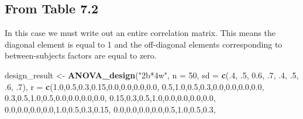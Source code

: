 \documentclass[
]{book}
\newenvironment{Shaded}{\begin{snugshade}}{\end{snugshade}}
\newcommand{\DataTypeTok}[1]{\textcolor[rgb]{0.13,0.29,0.53}{#1}}
\newcommand{\DecValTok}[1]{\textcolor[rgb]{0.00,0.00,0.81}{#1}}
\newcommand{\FloatTok}[1]{\textcolor[rgb]{0.00,0.00,0.81}{#1}}
\newcommand{\KeywordTok}[1]{\textcolor[rgb]{0.13,0.29,0.53}{\textbf{#1}}}
\newcommand{\NormalTok}[1]{#1}
\newcommand{\StringTok}[1]{\textcolor[rgb]{0.31,0.60,0.02}{#1}}
\begin{document}
\hypertarget{from-table-7.2}{%
\subsection{From Table 7.2}\label{from-table-7.2}}

In this case we must write out an entire correlation matrix.
This means the diagonal element is equal to 1 and the off-diagonal elements corresponding to between-subjects factors are equal to zero.

\begin{Shaded}
\begin{Highlighting}[]
\NormalTok{design_result <-}\StringTok{ }\KeywordTok{ANOVA_design}\NormalTok{(}\StringTok{"2b*4w"}\NormalTok{,}
                              \DataTypeTok{n =} \DecValTok{50}\NormalTok{,}
                              \DataTypeTok{sd =} \KeywordTok{c}\NormalTok{(.}\DecValTok{4}\NormalTok{, }\FloatTok{.5}\NormalTok{, }\FloatTok{0.6}\NormalTok{, }\FloatTok{.7}\NormalTok{,}
                                     \FloatTok{.4}\NormalTok{, }\FloatTok{.5}\NormalTok{, }\FloatTok{.6}\NormalTok{, }\FloatTok{.7}\NormalTok{),}
                              \DataTypeTok{r =} \KeywordTok{c}\NormalTok{(}\FloatTok{1.0}\NormalTok{,}\FloatTok{0.5}\NormalTok{,}\FloatTok{0.3}\NormalTok{,}\FloatTok{0.15}\NormalTok{,}\FloatTok{0.0}\NormalTok{,}\FloatTok{0.0}\NormalTok{,}\FloatTok{0.0}\NormalTok{,}\FloatTok{0.0}\NormalTok{,}
                                    \FloatTok{0.5}\NormalTok{,}\FloatTok{1.0}\NormalTok{,}\FloatTok{0.5}\NormalTok{,}\FloatTok{0.3}\NormalTok{,}\FloatTok{0.0}\NormalTok{,}\FloatTok{0.0}\NormalTok{,}\FloatTok{0.0}\NormalTok{,}\FloatTok{0.0}\NormalTok{,}
                                    \FloatTok{0.3}\NormalTok{,}\FloatTok{0.5}\NormalTok{,}\FloatTok{1.0}\NormalTok{,}\FloatTok{0.5}\NormalTok{,}\FloatTok{0.0}\NormalTok{,}\FloatTok{0.0}\NormalTok{,}\FloatTok{0.0}\NormalTok{,}\FloatTok{0.0}\NormalTok{,}
                                    \FloatTok{0.15}\NormalTok{,}\FloatTok{0.3}\NormalTok{,}\FloatTok{0.5}\NormalTok{,}\FloatTok{1.0}\NormalTok{,}\FloatTok{0.0}\NormalTok{,}\FloatTok{0.0}\NormalTok{,}\FloatTok{0.0}\NormalTok{,}\FloatTok{0.0}\NormalTok{,}
                                    \FloatTok{0.0}\NormalTok{,}\FloatTok{0.0}\NormalTok{,}\FloatTok{0.0}\NormalTok{,}\FloatTok{0.0}\NormalTok{,}\FloatTok{1.0}\NormalTok{,}\FloatTok{0.5}\NormalTok{,}\FloatTok{0.3}\NormalTok{,}\FloatTok{0.15}\NormalTok{,}
                                    \FloatTok{0.0}\NormalTok{,}\FloatTok{0.0}\NormalTok{,}\FloatTok{0.0}\NormalTok{,}\FloatTok{0.0}\NormalTok{,}\FloatTok{0.5}\NormalTok{,}\FloatTok{1.0}\NormalTok{,}\FloatTok{0.5}\NormalTok{,}\FloatTok{0.3}\NormalTok{,}

\end{Highlighting}
\end{Shaded}
\end{document}
